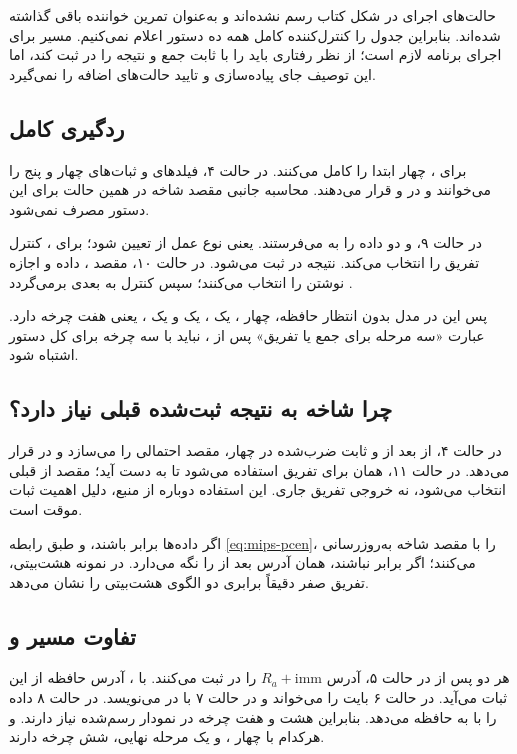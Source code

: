 حالت‌های اجرای  در شکل کتاب رسم نشده‌اند و به‌عنوان تمرین
خواننده باقی گذاشته شده‌اند. بنابراین جدول را کنترل‌کننده کامل همه ده دستور
اعلام نمی‌کنیم. مسیر  برای اجرای برنامه لازم است؛ از نظر رفتاری
باید  را با ثابت جمع و نتیجه را در  ثبت کند، اما این توصیف
جای پیاده‌سازی و تایید حالت‌های اضافه را نمی‌گیرد.

\subsection{ردگیری کامل }
برای ، چهار  ابتدا  را کامل می‌کنند.
در حالت ۴، فیلدهای  و  ثبات‌های چهار و پنج را می‌خوانند
و در  و  قرار می‌دهند.
محاسبه جانبی مقصد شاخه در همین حالت برای این دستور مصرف نمی‌شود.

در حالت ۹،  و  دو داده را به
 می‌فرستند.  یعنی نوع عمل از 
تعیین شود؛ برای ، کنترل  تفریق را انتخاب می‌کند.
نتیجه در  ثبت می‌شود.
در حالت ۱۰،  مقصد ،
 داده  و  اجازه نوشتن را
انتخاب می‌کنند؛ سپس کنترل به  بعدی برمی‌گردد
\cite[مثال ، صفحات چاپی ۳۷ و ۳۸]{weste}.

پس این  در مدل بدون انتظار حافظه، چهار ، یک ،
یک  و یک ، یعنی هفت چرخه دارد.
عبارت «سه مرحله برای جمع یا تفریق» پس از ، نباید با سه چرخه برای کل دستور اشتباه شود.

\subsection{چرا شاخه به نتیجه ثبت‌شده قبلی نیاز دارد؟}
در حالت ۴،  از  بعد از  و ثابت ضرب‌شده در چهار،
مقصد احتمالی را می‌سازد و در  قرار می‌دهد.
در حالت ۱۱، همان  برای تفریق  استفاده می‌شود تا
 به دست آید؛ مقصد از  قبلی انتخاب می‌شود، نه خروجی
تفریق جاری. این استفاده دوباره از منبع، دلیل اهمیت ثبات موقت است.

اگر داده‌ها برابر باشند،  و  طبق رابطه
\eqref{eq:mips-pcen}،  را با مقصد شاخه به‌روزرسانی می‌کنند؛
اگر برابر نباشند،  همان آدرس بعد از  را نگه می‌دارد.
در نمونه هشت‌بیتی، تفریق صفر دقیقاً برابری دو الگوی هشت‌بیتی را نشان می‌دهد.

\subsection{تفاوت مسیر  و }
هر دو پس از  در حالت ۵، آدرس \(R_a+\mathrm{imm}\) را
در  ثبت می‌کنند. با ، آدرس حافظه از این ثبات می‌آید.
 در حالت ۶ بایت را می‌خواند و در حالت ۷ با
 در  می‌نویسد.
 در حالت ۸ داده  را با  به حافظه می‌دهد.
بنابراین  هشت و  هفت چرخه در نمودار رسم‌شده نیاز دارند.
 و  هرکدام با چهار ،  و یک مرحله نهایی، شش چرخه دارند.

